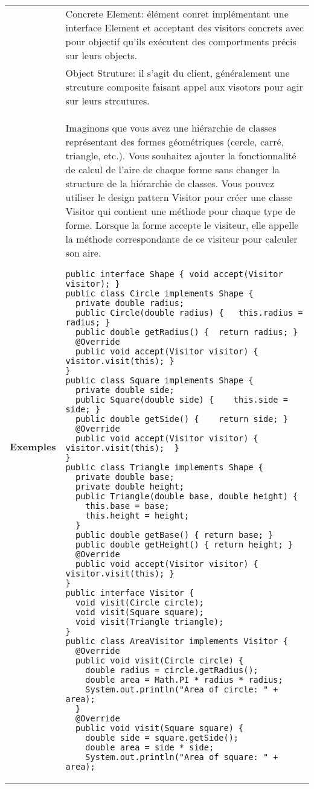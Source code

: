 \begin{table}[H]
\begin{adjustbox}{max width=\textwidth}
\begin{tabular}{l|p{\textwidth}}
& Concrete Element: \'el\'ement conret impl\'ementant une interface Element et acceptant des visitors concrets avec pour objectif qu'ils ex\'ecutent des comportments pr\'ecis sur leurs objects.\\
& Object Struture: il s'agit du client, g\'en\'eralement une strcuture composite faisant appel aux visotors pour agir sur leurs strcutures.\\
\cmidrule(lr){1-2}
\multirow{2}{*}{\textbf{Exemples}} & 
\hspace{4mm}
\begin{minipage}[tl]{0.5\textwidth}

Imaginons que vous avez une hiérarchie de classes représentant des formes géométriques (cercle, carré, triangle, etc.). Vous souhaitez ajouter la fonctionnalité de calcul de l'aire de chaque forme sans changer la structure de la hiérarchie de classes. Vous pouvez utiliser le design pattern Visitor pour créer une classe Visitor qui contient une méthode pour chaque type de forme. Lorsque la forme accepte le visiteur, elle appelle la méthode correspondante de ce visiteur pour calculer son aire.  
\begin{lstlisting}[style=monstyle]
public interface Shape { void accept(Visitor visitor); }
public class Circle implements Shape {
  private double radius;
  public Circle(double radius) {   this.radius = radius; }
  public double getRadius() {  return radius; }
  @Override
  public void accept(Visitor visitor) { visitor.visit(this); }
}
public class Square implements Shape {
  private double side; 
  public Square(double side) {    this.side = side; }
  public double getSide() {    return side; }
  @Override
  public void accept(Visitor visitor) {  visitor.visit(this);  }
}
public class Triangle implements Shape {
  private double base;
  private double height; 
  public Triangle(double base, double height) {
    this.base = base;
    this.height = height;
  }
  public double getBase() { return base; }
  public double getHeight() { return height; }
  @Override
  public void accept(Visitor visitor) { visitor.visit(this); }
}
public interface Visitor {
  void visit(Circle circle);
  void visit(Square square);
  void visit(Triangle triangle);
}
public class AreaVisitor implements Visitor {
  @Override
  public void visit(Circle circle) {
    double radius = circle.getRadius();
    double area = Math.PI * radius * radius;
    System.out.println("Area of circle: " + area);
  }
  @Override
  public void visit(Square square) {
    double side = square.getSide();
    double area = side * side;
    System.out.println("Area of square: " + area);

\end{lstlisting}
\end{minipage}
\end{tabular}
\end{adjustbox}
\end{table}
